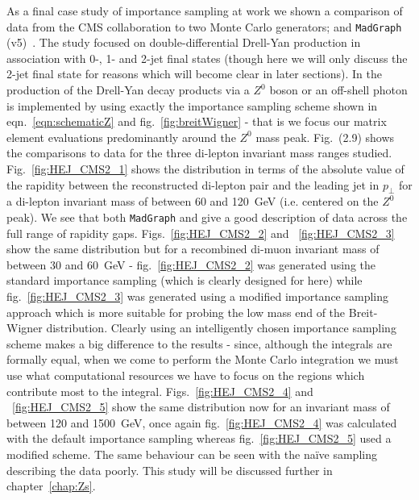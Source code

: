   	As a final case study of importance sampling at work we shown a comparison of data from the CMS collaboration to two Monte Carlo
  	generators; \HEJ and \texttt{MadGraph} (v5)~\cite{CMS:2014vtk}.  The study focused on double-differential Drell-Yan production in
  	association with 0-, 1- and 2-jet final states (though here we will only discuss the 2-jet final state for reasons which will
  	become clear in later sections).  In \HEJ the production of the Drell-Yan decay products via a $Z^0$ boson or an off-shell photon
  	is implemented by using exactly the importance sampling scheme shown in eqn.~\eqref{eqn:schematicZ} and fig.~\eqref{fig:breitWigner} -
  	that is we focus our matrix element evaluations predominantly around the $Z^0$ mass peak. Fig.~(2.9) shows the
  	comparisons to data for the three di-lepton invariant mass ranges studied.  Fig.~\eqref{fig:HEJ_CMS2_1} shows the distribution
  	in terms of the absolute value of the rapidity between the reconstructed di-lepton pair and the leading jet in $p_\perp$ for a di-lepton
  	invariant mass of between 60 and 120~GeV (i.e. centered on the $Z^0$ peak).  We see that both \texttt{MadGraph} and \HEJ give a good
  	description of data across the full range of rapidity gaps.  Figs.~\eqref{fig:HEJ_CMS2_2} and ~\eqref{fig:HEJ_CMS2_3} show the same
  	distribution but for a recombined di-muon invariant mass of between 30 and 60~GeV - fig.~\eqref{fig:HEJ_CMS2_2} was generated using the standard
  	importance sampling (which is clearly designed for here) while fig.~\eqref{fig:HEJ_CMS2_3} was generated using a modified importance
  	sampling approach which is more suitable for probing the low mass end of the Breit-Wigner distribution.  Clearly using an intelligently
  	chosen importance sampling scheme makes a big difference to the results - since, although the integrals are formally equal, when we
  	come to perform the Monte Carlo integration we must use what computational resources we have to focus on the regions which contribute
  	most to the integral.  Figs.~\eqref{fig:HEJ_CMS2_4} and ~\eqref{fig:HEJ_CMS2_5} show the same distribution now for an invariant
  	mass of between 120 and 1500~GeV, once again fig.~\eqref{fig:HEJ_CMS2_4} was calculated with the default importance sampling whereas
  	fig.~\eqref{fig:HEJ_CMS2_5} used a modified scheme.  The same behaviour can be seen with the na\"ive sampling describing the data
  	poorly.  This study will be discussed further in chapter~\ref{chap:Zs}.


